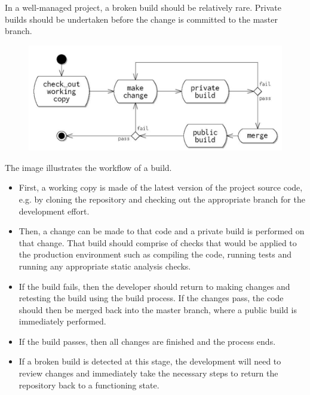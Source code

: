 \documentclass[a4paper, openany]{memoir}
\begin{document}
In a well-managed project, a broken build should be relatively rare. Private builds should be undertaken before the change is committed to the master branch.
\begin{figure}[H]
    \centering
    \includegraphics[scale=0.45]{src/9.3 preventing broken builds.PNG}
\end{figure}
\noindent The image illustrates the workflow of a build. 
\begin{itemize}
    \item First, a working copy is made of the latest version of the project source code, e.g. by cloning the repository and checking out the appropriate branch for the development effort. 
    \item Then, a change can be made to that code and a private build is performed on that change. That build should comprise of checks that would be applied to the production environment such as compiling the code, running tests and running any appropriate static analysis checks.
    \item If the build fails, then the developer should return to making changes and retesting the build using the build process. If the changes pass, the code should then be merged back into the master branch, where a public build is immediately performed.
    \item If the build passes, then all changes are finished and the process ends.
    \item If a broken build is detected at this stage, the development will need to review changes and immediately take the necessary steps to return the repository back to a functioning state.
\end{itemize}
\end{document}
